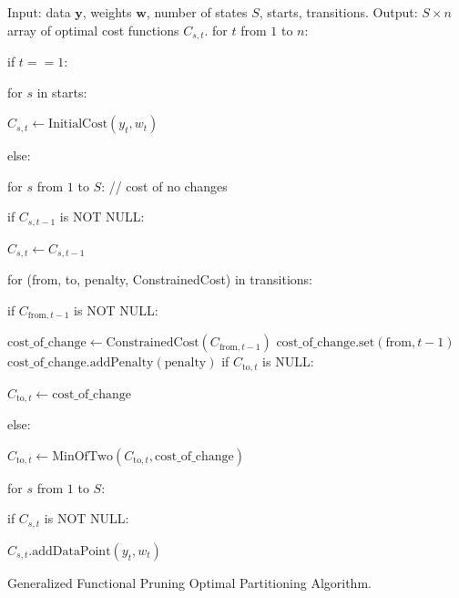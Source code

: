 \documentclass{article}
\begin{document}
\begin{algorithm}[H]
\begin{algorithmic}[1]
\STATE Input: data $\mathbf y$, weights $\mathbf w$, 
number of states $S$, starts, transitions.
\STATE Output: $S\times n$ array of optimal cost functions $C_{s,t}$.
\STATE for $t$ from $1$ to $n$:
\begin{ALC@g}
  \STATE if $t==1$:
  \begin{ALC@g}
    \STATE for $s$ in starts: 
    \begin{ALC@g}
      \STATE $C_{s,t}\gets\text{InitialCost}(y_t, w_t)$
    \end{ALC@g}
  \end{ALC@g}
  \STATE else:
  \begin{ALC@g}
    \STATE for $s$ from $1$ to $S$: // cost of no changes
    \begin{ALC@g}
      \STATE if $C_{s,t-1}$ is NOT NULL:
      \begin{ALC@g}
        \STATE $C_{s,t}\gets C_{s,t-1}$
      \end{ALC@g}
    \end{ALC@g}
    \STATE for (from, to, penalty, ConstrainedCost) in transitions:
    \begin{ALC@g}
      \STATE if $C_{\text{from},t-1}$ is NOT NULL:
      \begin{ALC@g}
        \STATE
        $\text{cost\_of\_change}\gets
        \text{ConstrainedCost}(C_{\text{from}, t-1})$
        \STATE
        $\text{cost\_of\_change.set}
        (\text{from}, t-1)$
        \STATE
        $\text{cost\_of\_change.addPenalty}
        (\text{penalty})$
        \STATE if $C_{\text{to},t}$ is NULL:
        \begin{ALC@g}
          \STATE $C_{\text{to},t}\gets\text{cost\_of\_change}$
        \end{ALC@g}
        \STATE else:
        \begin{ALC@g}
          \STATE
          $C_{\text{to},t}\gets \text{MinOfTwo}(C_{\text{to},t},
          \text{cost\_of\_change})$
        \end{ALC@g}
      \end{ALC@g}
    \end{ALC@g}
    \STATE for $s$ from $1$ to $S$:
    \begin{ALC@g}
      \STATE if $C_{s,t}$ is NOT NULL:
      \begin{ALC@g}
        \STATE $C_{s,t}\text{.addDataPoint}(y_t, w_t)$
      \end{ALC@g}
    \end{ALC@g}
  \end{ALC@g}
\end{ALC@g}
\caption{\label{algo:GFPOP}Generalized Functional Pruning Optimal
  Partitioning Algorithm.}
\end{algorithmic}
\end{algorithm}




\end{document}
